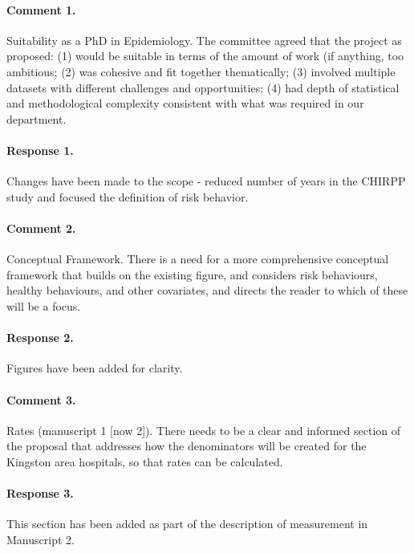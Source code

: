 \documentclass [11pt]{article}
\begin{document}
\paragraph{Comment 1.}Suitability as a PhD in Epidemiology.  The committee agreed that the project as proposed: (1) would be suitable in terms of the amount of work (if anything, too ambitious; (2) was cohesive and fit together thematically; (3) involved multiple datasets with different challenges and opportunities; (4) had depth of statistical and methodological complexity consistent with what was required in our department.

\paragraph{Response 1.} Changes have been made to the scope - reduced number of years in the CHIRPP study and focused the definition of risk behavior.

\paragraph{Comment 2.}Conceptual Framework.  There is a need for a more comprehensive conceptual framework that builds on the existing figure, and considers risk behaviours, healthy behaviours, and other covariates, and directs the reader to which of these will be a focus.

\paragraph{Response 2.}Figures have been added for clarity.
 
\paragraph{Comment 3.}Rates (manuscript 1 [now 2]).  There needs to be a clear and informed section of the proposal that addresses how the denominators will be created for the Kingston area hospitals, so that rates can be calculated.

\paragraph{Response 3.}This section has been added as part of the description of measurement in Manuscript 2.
\end{document}
